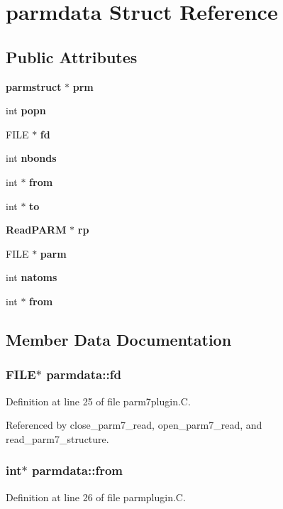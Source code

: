 \section{parmdata  Struct Reference}
\label{structparmdata}
\subsection*{Public Attributes}
\begin{CompactItemize}
\item 
{\bf parmstruct} $\ast$ {\bf prm}
\item 
int {\bf popn}
\item 
FILE $\ast$ {\bf fd}
\item 
int {\bf nbonds}
\item 
int $\ast$ {\bf from}
\item 
int $\ast$ {\bf to}
\item 
{\bf Read\-PARM} $\ast$ {\bf rp}
\item 
FILE $\ast$ {\bf parm}
\item 
int {\bf natoms}
\item 
int $\ast$ {\bf from}
\end{CompactItemize}


\subsection{Member Data Documentation}
\subsubsection{\setlength{\rightskip}{0pt plus 5cm}FILE$\ast$ parmdata::fd}\label{structparmdata_m2}




Definition at line 25 of file parm7plugin.C.

Referenced by close\_\-parm7\_\-read, open\_\-parm7\_\-read, and read\_\-parm7\_\-structure.
\subsubsection{\setlength{\rightskip}{0pt plus 5cm}int$\ast$ parmdata::from}\label{structparmdata_m9}




Definition at line 26 of file parmplugin.C.
